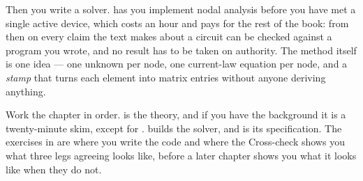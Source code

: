 Then you write a solver.  has you implement nodal analysis before you have met a
single active device, which costs an hour and pays for the rest of the book: from then on every
claim the text makes about a circuit can be checked against a program you wrote, and no result has
to be taken on authority. The method itself is one idea --- one unknown per node, one current-law
equation per node, and a \emph{stamp} that turns each element into matrix entries without anyone
deriving anything.

Work the chapter in order.  is the theory, and if you have the background it is a
twenty-minute skim, except for .  builds the solver, and
 is its specification. The exercises in  are where you
write the code and where the Cross-check shows you what three legs agreeing looks like, before a
later chapter shows you what it looks like when they do not.





